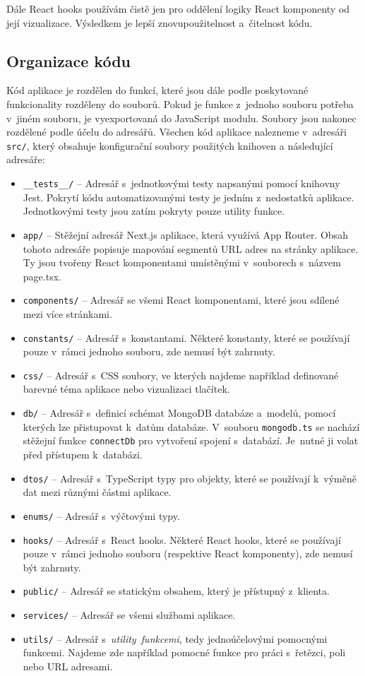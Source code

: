 \documentclass[
  biblatex,
  sourcecodes,
  glossaries,
  index
]{kidiplom}
\begin{document}
Dále React hooks používám čistě jen pro oddělení logiky React komponenty od její vizualizace. Výsledkem je lepší znovupoužitelnost a~čitelnost kódu.

\newpage

\subsection{Organizace kódu}

Kód aplikace je rozdělen do funkcí, které jsou dále podle poskytované funkcionality rozděleny do souborů. Pokud je funkce z~jednoho souboru potřeba v~jiném souboru, je vyexportovaná do JavaScript modulu. Soubory jsou nakonec rozdělené podle účelu do adresářů. Všechen kód aplikace nalezneme v~adresáři \texttt{src/}, který obsahuje konfigurační soubory použitých knihoven a následující adresáře:

\begin{itemize}
\item \texttt{\_\_tests\_\_/} -- Adresář s~jednotkovými testy napsanými pomocí knihovny Jest. Pokrytí kódu automatizovanými testy je jedním z~nedostatků aplikace. Jednotkovými testy jsou zatím pokryty pouze utility funkce.
\item \texttt{app/} -- Stěžejní adresář Next.js aplikace, která využívá App Router. Obsah tohoto adresáře popisuje mapování segmentů URL adres na stránky aplikace. Ty jsou tvořeny React komponentami umístěnými v~souborech s~názvem page.tsx.
\item \texttt{components/} -- Adresář se všemi React komponentami, které jsou sdílené mezi více stránkami.
\item \texttt{constants/} -- Adresář s~konstantami. Některé konstanty, které se používají pouze v~rámci jednoho souboru, zde nemusí být zahrnuty.
\item \texttt{css/} -- Adresář s~CSS soubory, ve kterých najdeme například definované barevné téma aplikace nebo vizualizaci tlačítek.
\item \texttt{db/} -- Adresář s~definicí schémat MongoDB databáze a~modelů, pomocí kterých lze přistupovat k~datům databáze. V~souboru \texttt{mongodb.ts} se nachází stěžejní funkce \texttt{connectDb} pro vytvoření spojení s~databází. Je~nutné ji volat před přístupem k~databázi.
\item \texttt{dtos/} -- Adresář s~TypeScript typy pro objekty, které se používají k~výměně dat mezi různými částmi aplikace.
\item \texttt{enums/} -- Adresář s~výčtovými typy.
\item \texttt{hooks/} -- Adresář s~React hooks. Některé React hooks, které se používají pouze v~rámci jednoho souboru (respektive React komponenty), zde nemusí být zahrnuty.
\item \texttt{public/} -- Adresář se statickým obsahem, který je přístupný z~klienta.
\item \texttt{services/} -- Adresář se všemi službami aplikace.
\item \texttt{utils/} -- Adresář s~\textit{utility~funkcemi}, tedy jednoúčelovými pomocnými funkcemi. Najdeme zde například pomocné funkce pro práci s~řetězci, poli nebo URL adresami.
\end{itemize}
\end{document}
